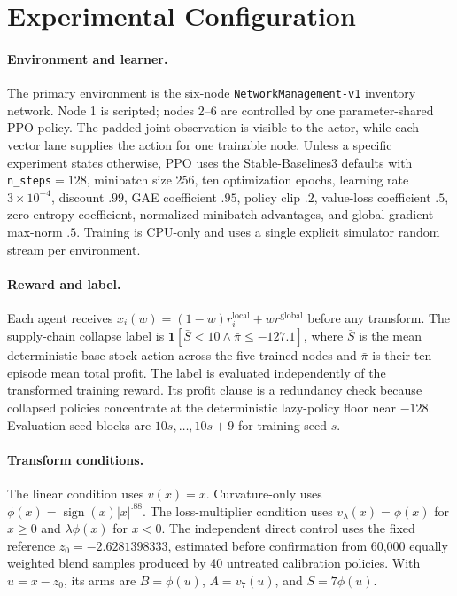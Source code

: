\suppressfloats[t]
\section{Experimental Configuration}
\label{app:configuration}

\paragraph{Environment and learner.}
The primary environment is the six-node \texttt{NetworkManagement-v1} inventory network. Node 1 is
scripted; nodes 2--6 are controlled by one parameter-shared PPO policy. The padded joint observation
is visible to the actor, while each vector lane supplies the action for one trainable node. Unless a
specific experiment states otherwise, PPO uses the Stable-Baselines3 defaults with
\texttt{n\_steps}$=128$, minibatch size 256, ten optimization epochs, learning rate
$3\times10^{-4}$, discount $.99$, GAE coefficient $.95$, policy clip $.2$, value-loss coefficient
$.5$, zero entropy coefficient, normalized minibatch advantages, and global gradient max-norm $.5$.
Training is CPU-only and uses a single explicit simulator random stream per environment.

\paragraph{Reward and label.}
Each agent receives $x_i(w)=(1-w)r_i^{\mathrm{local}}+wr^{\mathrm{global}}$ before any transform.
The supply-chain collapse label is
$\mathbf{1}[\bar S<10\wedge\bar\pi\le-127.1]$, where $\bar S$ is the mean deterministic base-stock
action across the five trained nodes and $\bar\pi$ is their ten-episode mean total profit. The label
is evaluated independently of the transformed training reward. Its profit clause is a redundancy
check because collapsed policies concentrate at the deterministic lazy-policy floor near $-128$.
Evaluation seed blocks are $10s,\ldots,10s+9$ for training seed $s$.

\paragraph{Transform conditions.}
The linear condition uses $v(x)=x$. Curvature-only uses
$\phi(x)=\operatorname{sign}(x)|x|^{.88}$. The loss-multiplier condition uses
$v_\lambda(x)=\phi(x)$ for $x\ge0$ and $\lambda\phi(x)$ for $x<0$. The independent direct control
uses the fixed reference $z_0=-2.6281398333$, estimated before confirmation from 60,000 equally
weighted blend samples produced by 40 untreated calibration policies. With $u=x-z_0$, its arms are
$B=\phi(u)$, $A=v_7(u)$, and $S=7\phi(u)$.

